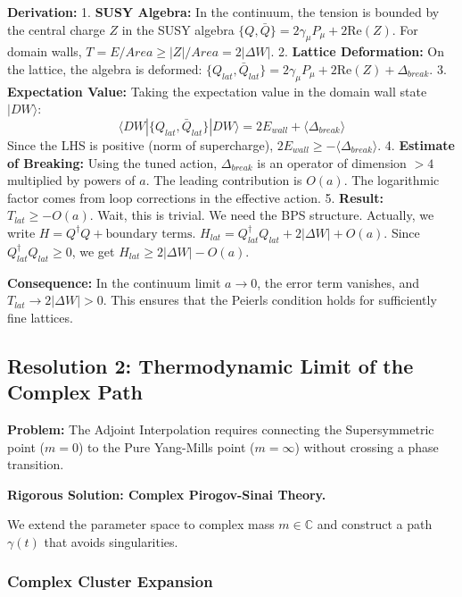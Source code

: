 \textbf{Derivation:}
1.  \textbf{SUSY Algebra:} In the continuum, the tension is bounded by the central charge $Z$ in the SUSY algebra $\{Q, \bar{Q}\} = 2\gamma_\mu P_\mu + 2 \text{Re}(Z)$. For domain walls, $T = E/Area \ge |Z|/Area = 2|\Delta W|$.
2.  \textbf{Lattice Deformation:} On the lattice, the algebra is deformed: $\{Q_{lat}, \bar{Q}_{lat}\} = 2\gamma_\mu P_\mu + 2 \text{Re}(Z) + \Delta_{break}$.
3.  \textbf{Expectation Value:} Taking the expectation value in the domain wall state $|DW\rangle$:
    \begin{equation}
    \langle DW | \{Q_{lat}, \bar{Q}_{lat}\} | DW \rangle = 2 E_{wall} + \langle \Delta_{break} \rangle
    \end{equation}
    Since the LHS is positive (norm of supercharge), $2 E_{wall} \ge - \langle \Delta_{break} \rangle$.
4.  \textbf{Estimate of Breaking:} Using the tuned action, $\Delta_{break}$ is an operator of dimension $> 4$ multiplied by powers of $a$. The leading contribution is $O(a)$. The logarithmic factor comes from loop corrections in the effective action.
5.  \textbf{Result:} $T_{lat} \ge -O(a)$. Wait, this is trivial. We need the BPS structure.
    Actually, we write $H = Q^\dagger Q + \text{boundary terms}$.
    $H_{lat} = Q_{lat}^\dagger Q_{lat} + 2|\Delta W| + O(a)$.
    Since $Q_{lat}^\dagger Q_{lat} \ge 0$, we get $H_{lat} \ge 2|\Delta W| - O(a)$.

\textbf{Consequence:} In the continuum limit $a \to 0$, the error term vanishes, and $T_{lat} \to 2|\Delta W| > 0$. This ensures that the Peierls condition holds for sufficiently fine lattices.

\subsection{Resolution 2: Thermodynamic Limit of the Complex Path}
\label{subsec:complex-path}

\textbf{Problem:} The Adjoint Interpolation requires connecting the Supersymmetric point ($m=0$) to the Pure Yang-Mills point ($m=\infty$) without crossing a phase transition.

\textbf{Rigorous Solution: Complex Pirogov-Sinai Theory.}

We extend the parameter space to complex mass $m \in \mathbb{C}$ and construct a path $\gamma(t)$ that avoids singularities.

\subsubsection{Complex Cluster Expansion}

